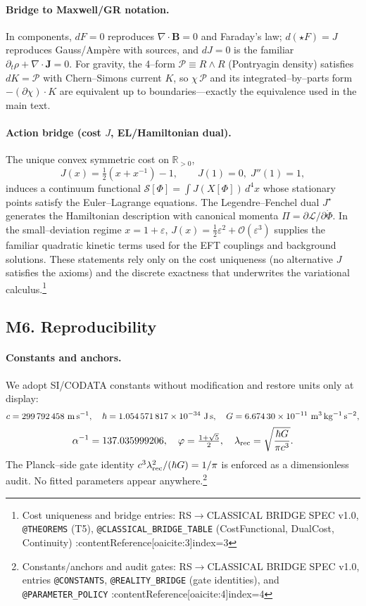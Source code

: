\documentclass[11pt]{article}
\begin{document}
\paragraph{Bridge to Maxwell/GR notation.}
In components, \(dF=0\) reproduces \(\nabla\!\cdot\! \mathbf{B}=0\) and Faraday’s law; \(d(\star F)=J\) reproduces Gauss/Ampère with sources, and \(dJ=0\) is the familiar \(\partial_t\rho+\nabla\!\cdot \mathbf{J}=0\). For gravity, the 4–form \( \mathcal{P}\equiv R\wedge R\) (Pontryagin density) satisfies \(dK=\mathcal{P}\) with Chern–Simons current \(K\), so \(\chi\,\mathcal{P}\) and its integrated–by–parts form \(-(\partial\chi)\!\cdot K\) are equivalent up to boundaries—exactly the equivalence used in the main text.

\paragraph{Action bridge (cost \(J\), EL/Hamiltonian dual).}
The unique convex symmetric cost on \(\mathbb{R}_{>0}\),
\[
  J(x)=\tfrac12(x+x^{-1})-1,\qquad J(1)=0,\;J''(1)=1,
\]
induces a continuum functional \(\mathcal{S}[\Phi]=\int J(X[\Phi])\,d^4x\) whose stationary points satisfy the Euler–Lagrange equations. The Legendre–Fenchel dual \(J^\star\) generates the Hamiltonian description with canonical momenta \(\Pi=\partial\mathcal{L}/\partial\dot\Phi\). In the small–deviation regime \(x=1+\varepsilon\), \(J(x)=\tfrac12\varepsilon^2+\mathcal{O}(\varepsilon^3)\) supplies the familiar quadratic kinetic terms used for the EFT couplings and background solutions. These statements rely only on the cost uniqueness (no alternative \(J\) satisfies the axioms) and the discrete exactness that underwrites the variational calculus.\footnote{Cost uniqueness and bridge entries: RS\(\to\)CLASSICAL BRIDGE SPEC v1.0, \texttt{@THEOREMS} (T5), \texttt{@CLASSICAL\_BRIDGE\_TABLE} (CostFunctional, DualCost, Continuity) :contentReference[oaicite:3]{index=3}}

\bigskip

\subsection*{M6. Reproducibility}

\paragraph{Constants and anchors.}
We adopt SI/CODATA constants without modification and restore units only at display:
\[
  c=299\,792\,458~{\rm m\,s^{-1}},\quad
  \hbar=1.054\,571\,817\times 10^{-34}~{\rm J\,s},\quad
  G=6.674\,30\times 10^{-11}~{\rm m^3\,kg^{-1}\,s^{-2}},
\]
\[
  \alpha^{-1}=137.035999206,\quad
  \varphi=\tfrac{1+\sqrt{5}}{2},\quad
  \lambda_{\rm rec}=\sqrt{\frac{\hbar G}{\pi c^3}}.
\]
The Planck–side gate identity
\(
  c^3\lambda_{\rm rec}^2/(\hbar G)=1/\pi
\)
is enforced as a dimensionless audit. No fitted parameters appear anywhere.\footnote{Constants/anchors and audit gates: RS\(\to\)CLASSICAL BRIDGE SPEC v1.0, entries \texttt{@CONSTANTS}, \texttt{@REALITY\_BRIDGE} (gate identities), and \texttt{@PARAMETER\_POLICY} :contentReference[oaicite:4]{index=4}}
\end{document}
